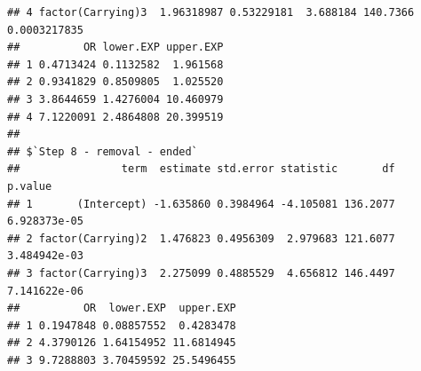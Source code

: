 \documentclass[
]{book}
\newenvironment{Shaded}{\begin{snugshade}}{\end{snugshade}}
\newcommand{\NormalTok}[1]{#1}
\newcommand{\SpecialCharTok}[1]{\textcolor[rgb]{0.00,0.00,0.00}{#1}}
\begin{document}
\begin{verbatim}
## 4 factor(Carrying)3  1.96318987 0.53229181  3.688184 140.7366 0.0003217835
##          OR lower.EXP upper.EXP
## 1 0.4713424 0.1132582  1.961568
## 2 0.9341829 0.8509805  1.025520
## 3 3.8644659 1.4276004 10.460979
## 4 7.1220091 2.4864808 20.399519
## 
## $`Step 8 - removal - ended`
##                term  estimate std.error statistic       df      p.value
## 1       (Intercept) -1.635860 0.3984964 -4.105081 136.2077 6.928373e-05
## 2 factor(Carrying)2  1.476823 0.4956309  2.979683 121.6077 3.484942e-03
## 3 factor(Carrying)3  2.275099 0.4885529  4.656812 146.4497 7.141622e-06
##          OR  lower.EXP  upper.EXP
## 1 0.1947848 0.08857552  0.4283478
## 2 4.3790126 1.64154952 11.6814945
## 3 9.7288803 3.70459592 25.5496455
\end{verbatim}

\begin{Shaded}
\end{Shaded}
\end{document}
